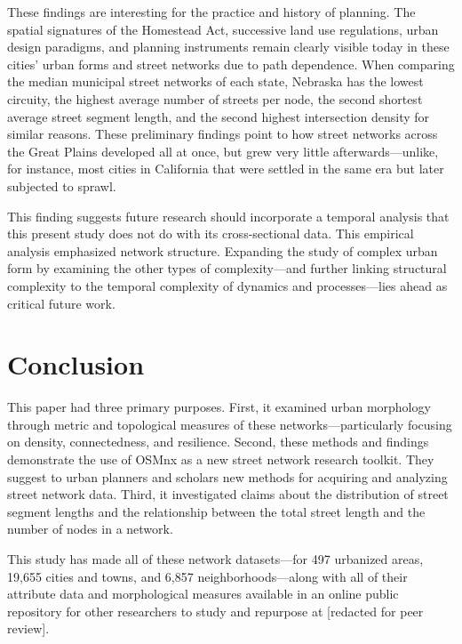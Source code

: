 \documentclass{article}
\begin{document}
These findings are interesting for the practice and history of planning. The spatial signatures of the Homestead Act, successive land use regulations, urban design paradigms, and planning instruments remain clearly visible today in these cities' urban forms and street networks due to path dependence. When comparing the median municipal street networks of each state, Nebraska has the lowest circuity, the highest average number of streets per node, the second shortest average street segment length, and the second highest intersection density for similar reasons. These preliminary findings point to how street networks across the Great Plains developed all at once, but grew very little afterwards---unlike, for instance, most cities in California that were settled in the same era but later subjected to sprawl. 

This finding suggests future research should incorporate a temporal analysis that this present study does not do with its cross-sectional data. This empirical analysis emphasized network structure. Expanding the study of complex urban form by examining the other types of complexity---and further linking structural complexity to the temporal complexity of dynamics and processes---lies ahead as critical future work.

\section{Conclusion}

This paper had three primary purposes. First, it examined urban morphology through metric and topological measures of these networks---particularly focusing on density, connectedness, and resilience. Second, these methods and findings demonstrate the use of OSMnx as a new street network research toolkit. They suggest to urban planners and scholars new methods for acquiring and analyzing street network data. Third, it investigated claims about the distribution of street segment lengths and the relationship between the total street length and the number of nodes in a network.

This study has made all of these network datasets---for 497 urbanized areas, 19,655 cities and towns, and 6,857 neighborhoods---along with all of their attribute data and morphological measures available in an online public repository for other researchers to study and repurpose at [redacted for peer review].




\end{document}
